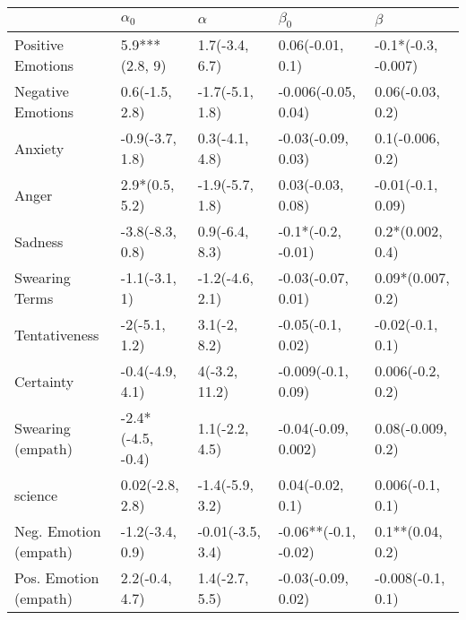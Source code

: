 \begin{tabular}{lllll}
\toprule
{} &         $\alpha_0$ &          $\alpha$ &             $\beta_0$ &              $\beta$ \\
\midrule
Positive Emotions     &     5.9***(2.8, 9) &    1.7(-3.4, 6.7) &      0.06(-0.01, 0.1) &  -0.1*(-0.3, -0.007) \\
Negative Emotions     &     0.6(-1.5, 2.8) &   -1.7(-5.1, 1.8) &   -0.006(-0.05, 0.04) &     0.06(-0.03, 0.2) \\
Anxiety               &    -0.9(-3.7, 1.8) &    0.3(-4.1, 4.8) &    -0.03(-0.09, 0.03) &     0.1(-0.006, 0.2) \\
Anger                 &     2.9*(0.5, 5.2) &   -1.9(-5.7, 1.8) &     0.03(-0.03, 0.08) &    -0.01(-0.1, 0.09) \\
Sadness               &    -3.8(-8.3, 0.8) &    0.9(-6.4, 8.3) &    -0.1*(-0.2, -0.01) &     0.2*(0.002, 0.4) \\
Swearing Terms        &      -1.1(-3.1, 1) &   -1.2(-4.6, 2.1) &    -0.03(-0.07, 0.01) &    0.09*(0.007, 0.2) \\
Tentativeness         &      -2(-5.1, 1.2) &      3.1(-2, 8.2) &     -0.05(-0.1, 0.02) &     -0.02(-0.1, 0.1) \\
Certainty             &    -0.4(-4.9, 4.1) &     4(-3.2, 11.2) &    -0.009(-0.1, 0.09) &     0.006(-0.2, 0.2) \\
Swearing (empath)     &  -2.4*(-4.5, -0.4) &    1.1(-2.2, 4.5) &   -0.04(-0.09, 0.002) &    0.08(-0.009, 0.2) \\
science               &    0.02(-2.8, 2.8) &   -1.4(-5.9, 3.2) &      0.04(-0.02, 0.1) &     0.006(-0.1, 0.1) \\
Neg. Emotion (empath) &    -1.2(-3.4, 0.9) &  -0.01(-3.5, 3.4) &  -0.06**(-0.1, -0.02) &     0.1**(0.04, 0.2) \\
Pos. Emotion (empath) &     2.2(-0.4, 4.7) &    1.4(-2.7, 5.5) &    -0.03(-0.09, 0.02) &    -0.008(-0.1, 0.1) \\
\bottomrule
\end{tabular}
